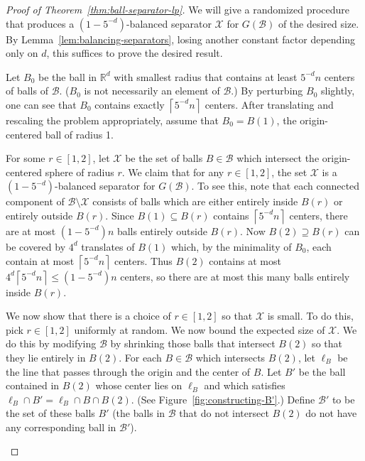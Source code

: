 \documentclass[11pt, reqno]{amsart}
\theoremstyle{plain}
\theoremstyle{definition}
\theoremstyle{remark}
\numberwithin{theorem}{section}
\numberwithin{equation}{section}
\newcommand{\ceil}[1]{\left\lceil #1 \right\rceil}
\newcommand{\R}{\mathbb R}
\newcommand{\fB}{\mathcal B}
\newcommand{\fX}{\mathcal X}
\begin{document}
\begin{proof}[Proof of Theorem~\ref{thm:ball-separator-lp}]
We will give a randomized procedure that produces a $(1-5^{-d})$-balanced separator $\fX$ for $G(\fB)$ of the desired size. By Lemma~\ref{lem:balancing-separators}, losing another constant factor depending only on $d$, this suffices to prove the desired result.

Let $B_0$ be the ball in $\R^d$ with smallest radius that contains at least $5^{-d}n$ centers of balls of $\fB$. ($B_0$ is not necessarily an element of $\fB$.) By perturbing $B_0$ slightly, one can see that $B_0$ contains exactly $\ceil{5^{-d}n}$ centers. After translating and rescaling the problem appropriately, assume that $B_0=B(1)$, the origin-centered ball of radius 1.

For some $r\in[1,2]$, let $\fX$ be the set of balls $B\in\fB$ which intersect the origin-centered sphere of radius $r$. We claim that for any $r\in[1,2]$, the set $\fX$ is a $(1-5^{-d})$-balanced separator for $G(\fB)$. To see this, note that each connected component of $\fB\setminus \fX$ consists of balls which are either entirely inside $B(r)$ or entirely outside $B(r)$. Since $B(1)\subseteq B(r)$ contains $\ceil{5^{-d}n}$ centers, there are at most $(1-5^{-d})n$ balls entirely outside $B(r)$. Now $B(2)\supseteq B(r)$ can be covered by $4^d$ translates of $B(1)$ which, by the minimality of $B_0$, each contain at most $\ceil{5^{-d}n}$ centers. Thus $B(2)$ contains at most $4^d\ceil{5^{-d}n}\leq (1-5^{-d})n$ centers, so there are at most this many balls entirely inside $B(r)$.

We now show that there is a choice of $r\in[1,2]$ so that $\fX$ is small. To do this, pick $r\in[1,2]$ uniformly at random. We now bound the expected size of $\fX$. We do this by modifying $\fB$ by shrinking those balls that intersect $B(2)$ so that they lie entirely in $B(2)$. For each $B\in\fB$ which intersects $B(2)$, let $\ell_B$ be the line that passes through the origin and the center of $B$. Let $B'$ be the ball contained in $B(2)$ whose center lies on $\ell_B$ and which satisfies $\ell_B\cap B'=\ell_B\cap B\cap B(2)$. (See Figure~\ref{fig:constructing-B'}.) Define $\fB'$ to be the set of these balls $B'$ (the balls in $\fB$ that do not intersect $B(2)$ do not have any corresponding ball in $\fB'$).

\begin{figure}
\centering
{}
\end{figure}
\end{proof}
\end{document}
